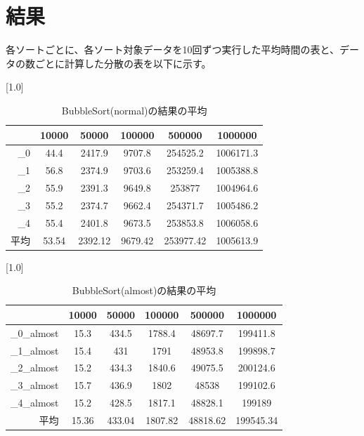 \documentclass[a4j,dvipdfmx]{jsreport}
\begin{document}
\section{結果}
各ソートごとに、各ソート対象データを10回ずつ実行した平均時間の表と、データの数ごとに計算した分散の表を以下に示す。
\begin{table}[hbtp]
\caption{BubbleSort(normal)の結果の平均}
\label{table:data_type}
\centering
\scalebox{1.0}[1.0]{
\begin{tabular}{|r||ccccc|}
\hline
 & 10000 & 50000 & 100000 & 500000 & 1000000 \\ \hline
\_0 & 44.4 & 2417.9 & 9707.8 & 254525.2 & 1006171.3 \\
\_1 & 56.8 & 2374.9 & 9703.6 & 253259.4 & 1005388.8 \\
\_2 & 55.9 & 2391.3 & 9649.8 & 253877 & 1004964.6 \\
\_3 & 55.2 & 2374.7 & 9662.4 & 254371.7 & 1005486.2 \\
\_4 & 55.4 & 2401.8 & 9673.5 & 253853.8 & 1006058.6 \\ \hline
平均 & 53.54 & 2392.12 & 9679.42 & 253977.42 & 1005613.9 \\
\hline
\end{tabular}
}
\end{table}
\begin{table}[hbtp]
\caption{BubbleSort(almost)の結果の平均}
\label{table:data_type}
\centering
\scalebox{1.0}[1.0]{
\begin{tabular}{|r||ccccc|}
\hline
 & 10000 & 50000 & 100000 & 500000 & 1000000 \\ \hline
\_0\_almost & 15.3 & 434.5 & 1788.4 & 48697.7 & 199411.8 \\
\_1\_almost & 15.4 & 431 & 1791 & 48953.8 & 199898.7 \\
\_2\_almost & 15.2 & 434.3 & 1840.6 & 49075.5 & 200124.6 \\
\_3\_almost & 15.7 & 436.9 & 1802 & 48538 & 199102.6 \\
\_4\_almost & 15.2 & 428.5 & 1817.1 & 48828.1 & 199189 \\ \hline
平均 & 15.36 & 433.04 & 1807.82 & 48818.62 & 199545.34 \\
\hline
\end{tabular}
}
\end{table}
\end{document}

